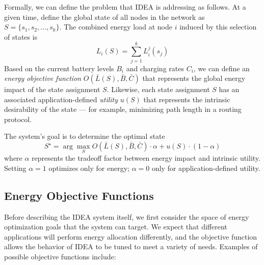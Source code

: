 Formally, we can define the problem that IDEA is addressing as follows. At a
given time, define the global state of all nodes in the network as $S = \{
s_1, s_2, \ldots, s_k \}$. The combined energy load at node $i$ induced by
this selection of states is \[ L_i(S) = \sum_{j=1}^k L_i^j(s_j) \] Based on
the current battery levels $B_i$ and charging rates $C_i$, we can define an
\textit{energy objective function} $O(\bar{L}(S), \bar{B}, \bar{C})$ that
represents the global energy impact of the state assignment $S$. Likewise,
each state assignment $S$ has an associated application-defined
\textit{utility} $u(S)$ that represents the intrinsic desirability of the
state --- for example, minimizing path length in a routing protocol.

The system's goal is to determine the optimal state \[ S^\star = \arg
\max_{S} O(\bar{L}(S), \bar{B}, \bar{C}) \cdot \alpha + u(S) \cdot
(1-\alpha)\] where $\alpha$ represents the tradeoff factor between energy
impact and intrinsic utility. Setting $\alpha=1$ optimizes only for energy;
$\alpha=0$ only for application-defined utility.

\subsection{Energy Objective Functions}
\label{idea-subsec-energyobjectivefunctions}

Before describing the IDEA system itself, we first consider the space
of energy optimization goals that the system can target.
We expect that different applications will perform
energy allocation differently, and the objective function allows
the behavior of IDEA to be tuned to meet a variety of needs.
Examples of possible objective functions include:

